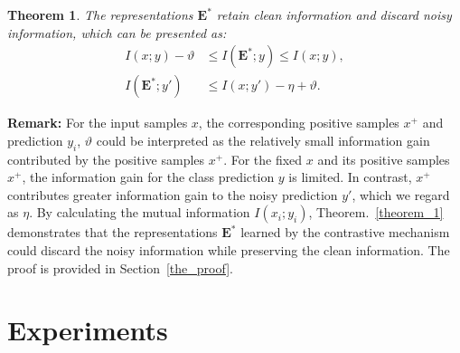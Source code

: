 \documentclass{article}
\theoremstyle{plain}
\newtheorem{theorem}{Theorem}[section]
\theoremstyle{definition}
\theoremstyle{remark}
\begin{document}
\begin{theorem}
The representations ${\textbf{E}^*}$ retain clean information and discard noisy information, which can be presented as:
\begin{equation}
\begin{aligned}
I(x;y)- \vartheta &\le I(\textbf{E}^*;y) \le I(x;y),\\
I(\textbf{E}^*;y') &\le I(x;y')-\eta + \vartheta.
\end{aligned}
\label{theorem_1}
\end{equation} 
\end{theorem} 

\textbf{Remark:} For the input samples $x$, the corresponding positive samples $x^+$ and prediction $y_i$, $\vartheta$ could be interpreted as the relatively small information gain contributed by the positive samples $x^+$. For the fixed $x$ and its positive samples $x^+$, the information gain for the class prediction $y$ is limited. In contrast, $x^+$ contributes greater information gain to the noisy prediction $y'$, which we regard as $\eta$. By calculating the mutual information $I(x_i;y_i)$, Theorem.~\ref{theorem_1} demonstrates that the representations $\textbf{E}^*$ learned by the contrastive mechanism could discard the noisy information while preserving the clean information. The proof is provided in Section~\ref{the_proof}.


\section{Experiments}


\begin{table}[]
\centering
\caption{Statistics summary of six benchmark datasets.}
\label{data_info}
\end{table}
\end{document}
